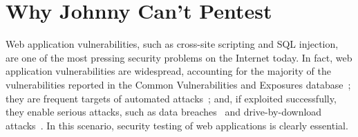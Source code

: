 
\section{Why Johnny Can't Pentest}

Web application vulnerabilities, such as cross-site scripting and SQL
injection, are one of the most pressing security problems on the
Internet today. In fact, web application vulnerabilities are widespread, accounting
for the majority of the vulnerabilities reported in the Common
Vulnerabilities and Exposures database~\cite{cve}; they are 
frequent targets of automated attacks~\cite{small08predator}; and, if
exploited successfully, they enable serious attacks, such as data
breaches~\cite{datalossdb} and drive-by-download
attacks~\cite{provos08iframes}. 
In this scenario, security testing of web applications is clearly
essential.  


%

